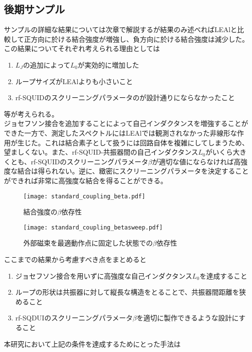 \subsection{後期サンプル}
サンプルの詳細な結果については次章で解説するが結果のみ述べればLEAlと比較して正方向に於ける結合強度が増強し、負方向に於ける結合強度は減少した。
この結果についてそれぞれ考えられる理由としては
\begin{enumerate}
    \item $L_J$の追加によって$L_0$が実効的に増加した
    \item ループサイズがLEAlよりも小さいこと
    \item rf-SQUIDのスクリーニングパラメータのが設計通りにならなかったこと
 \end{enumerate}
 等が考えられる。\\
 ジョセフソン接合を追加することによって自己インダクタンスを増強することができた一方で、測定したスペクトルにはLEAlでは観測されなかった非線形な作用が生じた。これは結合素子として扱うには回路自体を複雑にしてしまうため、望ましくない。また、rf-SQUID-共振器間の自己インダクタンス$L_0$がいくら大きくとも、rf-SQUIDのスクリーニングパラメータ$\beta$が適切な値にならなければ高強度な結合は得られない。逆に、緻密にスクリーニングパラメータを決定することができれば非常に高強度な結合を得ることができる。
 \begin{figure}[H]
    \begin{minipage}[t]{0.5\columnwidth}
        \centering
        \texttt{[image: standard\_coupling\_beta.pdf]}
        \caption{結合強度の$\beta$依存性}
    \end{minipage}%
    \begin{minipage}[t]{0.5\columnwidth}
        \centering
        \texttt{[image: standard\_coupling\_betasweep.pdf]}
        \caption{外部磁束を最適動作点に固定した状態での$\beta$依存性}
    \end{minipage}
\end{figure}
 ここまでの結果から考慮すべき点をまとめると
 \begin{enumerate}
    \item ジョセフソン接合を用いずに高強度な自己インダクタンス$L_0$を達成すること
    \item ループの形状は共振器に対して縦長な構造をとることで、共振器間距離を狭めること
    \item rf-SQDUIのスクリーニングパラメータ$\beta$を適切に製作できるような設計にすること
 \end{enumerate}
本研究において上記の条件を達成するためにとった手法は
